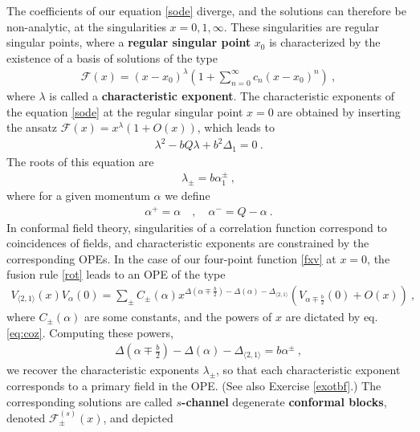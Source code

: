 \documentclass[12pt, a4paper, notitlepage, twoside]{report}
\numberwithin{equation}{section}
\theoremstyle{break}
\begin{document}
The coefficients of our equation \eqref{sode} diverge, and the solutions can therefore be non-analytic, at the singularities $x=0,1,\infty$.
These singularities are regular singular points, where a \textbf{regular singular point} $x_0$ is characterized by the existence of a basis of solutions of the type  
\begin{align}
 \mathcal{F}(x)=(x-x_0)^\lambda\left(1+\sum_{n=0}^\infty c_n (x-x_0)^n\right)\ ,
\label{zxl}
\end{align}
where $\lambda$ is called a \textbf{\boldmath characteristic exponent}.
The characteristic exponents of the equation \eqref{sode} at the regular singular point $x=0$ are obtained by inserting the ansatz $\mathcal{F}(x) = x^\lambda(1+O(x))$, which leads to 
\begin{align}
 \lambda^2 - bQ\lambda + b^2 \Delta_1 = 0 \ .
\end{align}
The roots of this equation are 
\begin{align}
 \lambda_\pm = b\alpha_1^\pm \ , 
\label{lpm}
\end{align}
where for a given momentum $\alpha$ we define 
\begin{align}
 \alpha^+ = \alpha \quad , \quad \alpha^- = Q-\alpha\ .
\label{apm}
\end{align}
In conformal field theory, singularities of a correlation function correspond to coincidences of fields, and characteristic exponents are constrained by the corresponding OPEs.
In the case of our four-point function \eqref{fxv} at $x=0$, the fusion rule \eqref{rot} leads to an OPE of the type
\begin{align}
 V_{\langle 2,1 \rangle}(x)V_{\alpha}(0) = \sum_\pm C_\pm(\alpha) x^{\Delta\left(\alpha\mp \frac{b}{2}\right) -\Delta(\alpha) - \Delta_{\langle 2,1 \rangle}} \left(V_{\alpha\mp\frac{b}{2}}(0) + O(x)\right)\ ,
\end{align}
where $C_\pm(\alpha)$ are some constants, and the powers of $x$ are dictated by eq. \eqref{eq:coz}. 
Computing these powers,
\begin{align}
 \Delta\left(\alpha\mp \frac{b}{2}\right) -\Delta(\alpha) - \Delta_{\langle 2,1 \rangle}  = b \alpha^{\pm}\ ,
\end{align}
we recover the characteristic exponents $\lambda_\pm$, so that each characteristic exponent corresponds to a primary field in the OPE.
(See also Exercise \ref{exotbf}.) The corresponding solutions are called \textbf{\boldmath $s$-channel} degenerate \textbf{conformal blocks}, denoted $\mathcal{F}^{(s)}_\pm(x)$, and depicted
\end{document}
